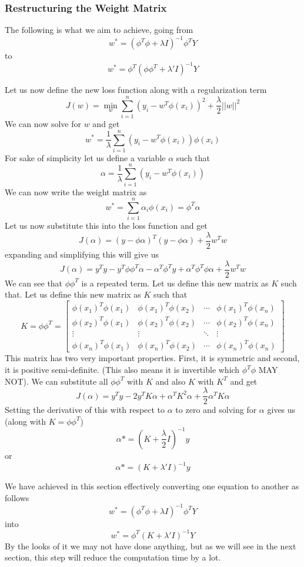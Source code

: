 \documentclass[hidelinks]{book}
\numberwithin{equation}{section}
\begin{document}
\subsubsection{Restructuring the Weight Matrix}
The following is what we aim to achieve, going from
$$w^* =(\phi^T \phi + \lambda I)^{-1} \phi^T Y $$
to
$$w^* = \phi^T (\phi \phi^T + \lambda' I)^{-1} Y $$

Let us now define the new loss function along with a regularization term
$$ J(w) = \min_w \sum_{i=1}^n (y_i - w^T \phi(x_i))^2 + \frac{\lambda}{2} ||w||^2 $$ We can now solve for $w$ and get
$$ w^* = \frac{1}{\lambda} \sum_{i=1}^n (y_i - w^T \phi(x_i)) \phi(x_i) $$ For sake of simplicity let us define a variable $\alpha$ such that
$$ \alpha = \frac{1}{\lambda} \sum_{i=1}^n (y_i - w^T \phi(x_i)) $$ We can now write the weight matrix as
$$ w^* = \sum_{i=1}^n \alpha_i \phi(x_i) = \phi^T \alpha $$ Let us now substitute this into the loss function and get
$$ J(\alpha) = (y - \phi \alpha)^T (y - \phi \alpha) + \frac{\lambda}{2} w^T w $$ expanding and simplifying this will give us
$$ J(\alpha) = y^T y - y^T \phi \phi^T \alpha - \alpha^T \phi^T y + \alpha^T \phi^T \phi \alpha + \frac{\lambda}{2} w^T w $$ We can see that $\phi \phi^T$ is a repeated term. Let us define this new matrix as $K$ such that. Let us define this new matrix as $K$ such that
$$ K = \phi \phi^T = \begin{bmatrix}
\phi(x_1)^T \phi(x_1) & \phi(x_1)^T \phi(x_2) & \cdots & \phi(x_1)^T \phi(x_n) \\
\phi(x_2)^T \phi(x_1) & \phi(x_2)^T \phi(x_2) & \cdots & \phi(x_2)^T \phi(x_n) \\
\vdots & \vdots & \ddots & \vdots \\
\phi(x_n)^T \phi(x_1) & \phi(x_n)^T \phi(x_2) & \cdots & \phi(x_n)^T \phi(x_n) \end{bmatrix} $$ This matrix has two very important properties. First, it is symmetric and second, it is positive semi-definite. (This also means it is invertible which $\phi^T \phi$ MAY NOT). We can substitute all $\phi \phi^T$ with $K$ and also $K$ with $K^T$ and get
$$ J(\alpha) = y^T y - 2 y^T K \alpha + \alpha^T K^2 \alpha + \frac{\lambda}{2} \alpha^T K \alpha $$
Setting the derivative of this with respect to $\alpha$
to zero and solving for $\alpha$ gives us (along with $K = \phi \phi^T$)
$$ \alpha* = (K + \frac{\lambda}{2} I)^{-1} y $$ or $$ \alpha* = (K+ \lambda' I)^{-1} y $$

We have achieved in this section effectively converting
one equation to another as follows
$$ w^* = (\phi^T \phi + \lambda I)^{-1} \phi^T Y $$ into
$$ w^* = \phi^T (K + \lambda' I)^{-1} Y $$ By the looks of it we may not have
done anything, but as we will see in the next section, this step will reduce
the computation time by a lot.
\end{document}
